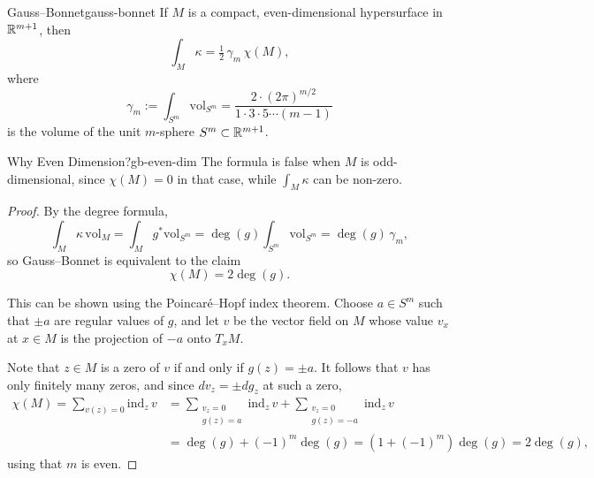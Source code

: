 \begin{theorem}{Gauss--Bonnet}{gauss-bonnet}
    If $M$ is a compact, even-dimensional hypersurface in $\mathbb{R}^{m+1}$, then
    \[
        \int_M \kappa = \tfrac{1}{2}\, \gamma_m\, \chi(M),
    \]
    where
    \[
        \gamma_m := \int_{S^m} \mathrm{vol}_{S^m} = \frac{2 \cdot (2\pi)^{m/2}}{1 \cdot 3 \cdot 5 \cdots (m-1)}
    \]
    is the volume of the unit $m$-sphere $S^m \subset \mathbb{R}^{m+1}$.
\end{theorem}

\begin{remark}{Why Even Dimension?}{gb-even-dim}
    The formula is false when $M$ is odd-dimensional, since $\chi(M) = 0$ in that case, while $\int_M \kappa$ can be non-zero.
\end{remark}

\begin{proof}
    By the degree formula,
    \[
        \int_M \kappa\, \mathrm{vol}_M = \int_M g^* \mathrm{vol}_{S^m} = \deg(g) \int_{S^m} \mathrm{vol}_{S^m} = \deg(g)\, \gamma_m,
    \]
    so Gauss--Bonnet is equivalent to the claim
    \[
        \chi(M) = 2 \deg(g).
    \]

    This can be shown using the Poincar\'e--Hopf index theorem. Choose $a \in S^m$ such that $\pm a$ are regular values of $g$, and let $v$ be the vector field on $M$ whose value $v_x$ at $x \in M$ is the projection of $-a$ onto $T_x M$.

    Note that $z \in M$ is a zero of $v$ if and only if $g(z) = \pm a$. It follows that $v$ has only finitely many zeros, and since $dv_z = \pm dg_z$ at such a zero,
    \begin{align*}
        \chi(M) = \sum_{v(z) = 0} \mathrm{ind}_z\, v &= \sum_{\substack{v_z = 0 \\ g(z) = a}} \mathrm{ind}_z\, v + \sum_{\substack{v_z = 0 \\ g(z) = -a}} \mathrm{ind}_z\, v \\
        &= \deg(g) + (-1)^m \deg(g) = (1 + (-1)^m) \deg(g) = 2 \deg(g),
    \end{align*}
    using that $m$ is even.
\end{proof}

